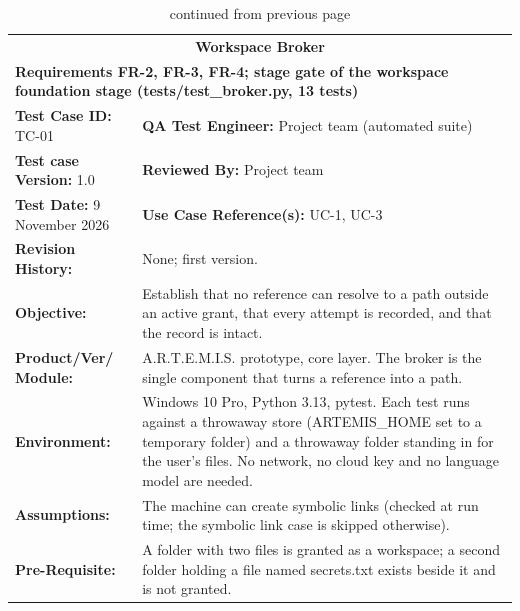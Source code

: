\documentclass{FastFyp}
\begin{document}
{\small
{}
\begin{longtable}{|p{2.4cm}p{5.0cm}p{2.4cm}p{3.8cm}|}
\caption{Test case TC-01: workspace boundary.}\label{tab:tc1}\\*
\endfirsthead
\caption[]{continued from previous page}\\*
\endhead
\hline
\multicolumn{4}{|c|}{\textbf{Workspace Broker}} \\* \hline
\multicolumn{4}{|p{14.8cm}|}{\textbf{Requirements FR-2, FR-3, FR-4; stage gate of the workspace foundation stage (tests/test\_broker.py, 13 tests)}} \\* \hline
\multicolumn{2}{|p{7.8cm}|}{\textbf{Test Case ID:} TC-01} &
  \multicolumn{2}{p{6.6cm}|}{\textbf{QA Test Engineer:} Project team (automated suite)} \\* \hline
\multicolumn{2}{|p{7.8cm}|}{\textbf{Test case Version:} 1.0} &
  \multicolumn{2}{p{6.6cm}|}{\textbf{Reviewed By:} Project team} \\* \hline
\multicolumn{2}{|p{7.8cm}|}{\textbf{Test Date:} 9 November 2026} &
  \multicolumn{2}{p{6.6cm}|}{\textbf{Use Case Reference(s):} UC-1, UC-3} \\ \hline
\multicolumn{1}{|p{2.4cm}|}{\textbf{Revision History:}} &
  \multicolumn{3}{p{12.0cm}|}{None; first version.} \\ \hline
\multicolumn{1}{|p{2.4cm}|}{\textbf{Objective:}} &
  \multicolumn{3}{p{12.0cm}|}{Establish that no reference can resolve to a path outside an active grant, that every attempt is recorded, and that the record is intact.} \\ \hline
\multicolumn{1}{|p{2.4cm}|}{\textbf{Product/Ver/ Module:}} &
  \multicolumn{3}{p{12.0cm}|}{A.R.T.E.M.I.S. prototype, core layer. The broker is the single component that turns a reference into a path.} \\ \hline
\multicolumn{1}{|p{2.4cm}|}{\textbf{Environment:}} &
  \multicolumn{3}{p{12.0cm}|}{Windows 10 Pro, Python 3.13, pytest. Each test runs against a throwaway store (ARTEMIS\_HOME set to a temporary folder) and a throwaway folder standing in for the user's files. No network, no cloud key and no language model are needed.} \\ \hline
\multicolumn{1}{|p{2.4cm}|}{\textbf{Assumptions:}} &
  \multicolumn{3}{p{12.0cm}|}{The machine can create symbolic links (checked at run time; the symbolic link case is skipped otherwise).} \\ \hline
\multicolumn{1}{|p{2.4cm}|}{\textbf{Pre-Requisite:}} &
  \multicolumn{3}{p{12.0cm}|}{A folder with two files is granted as a workspace; a second folder holding a file named secrets.txt exists beside it and is not granted.} \\ \hline

\end{longtable}}
\end{document}
